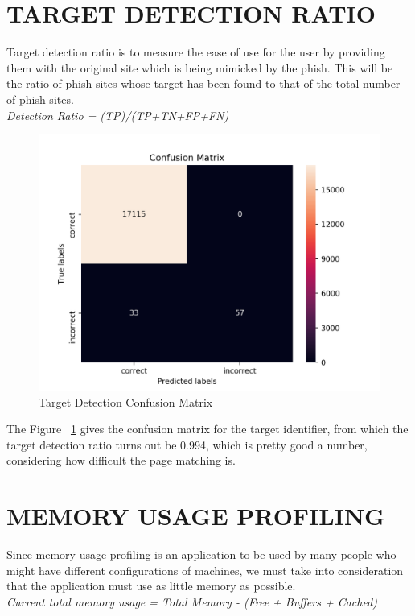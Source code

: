 \section{TARGET DETECTION RATIO}
Target detection ratio is to measure the ease of use for the user by providing them with the original site which is being mimicked by the phish. This will be the ratio of phish sites whose target has been found to that of the total number of phish sites.\\
\null\quad\textit{Detection Ratio = (TP)/(TP+TN+FP+FN)}\\

\begin{figure}[htp]
\centering
\includegraphics[scale=0.5]{Figures/image4.png}
\caption{Target Detection Confusion Matrix}
\label{fig:tdcm}
\end{figure}

The Figure ~\ref{fig:tdcm} gives the confusion matrix for the target identifier, from which the target detection ratio turns out be 0.994, which is pretty good a number, considering how difficult the page matching is.


\section{MEMORY USAGE PROFILING}
Since memory usage profiling is an application to be used by many people who might have different configurations of machines, we must take into consideration that the application must use as little memory as possible.\\
\null\quad\textit{Current total memory usage = Total Memory - (Free + Buffers + Cached)}\\

